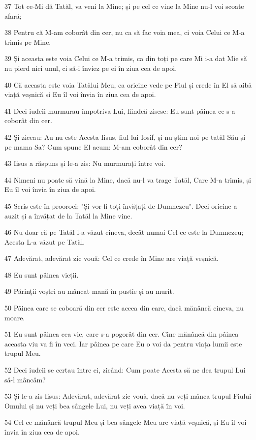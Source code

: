 \par 37 Tot ce-Mi dă Tatăl, va veni la Mine; și pe cel ce vine la Mine nu-l voi scoate afară;
\par 38 Pentru că M-am coborât din cer, nu ca să fac voia mea, ci voia Celui ce M-a trimis pe Mine.
\par 39 Și aceasta este voia Celui ce M-a trimis, ca din toți pe care Mi i-a dat Mie să nu pierd nici unul, ci să-i înviez pe ei în ziua cea de apoi.
\par 40 Că aceasta este voia Tatălui Meu, ca oricine vede pe Fiul și crede în El să aibă viață veșnică și Eu îl voi învia în ziua cea de apoi.
\par 41 Deci iudeii murmurau împotriva Lui, fiindcă zisese: Eu sunt pâinea ce s-a coborât din cer.
\par 42 Și ziceau: Au nu este Acesta Iisus, fiul lui Iosif, și nu știm noi pe tatăl Său și pe mama Sa? Cum spune El acum: M-am coborât din cer?
\par 43 Iisus a răspuns și le-a zis: Nu murmurați între voi.
\par 44 Nimeni nu poate să vină la Mine, dacă nu-l va trage Tatăl, Care M-a trimis, și Eu îl voi învia în ziua de apoi.
\par 45 Scris este în prooroci: "Și vor fi toți învățați de Dumnezeu". Deci oricine a auzit și a învățat de la Tatăl la Mine vine.
\par 46 Nu doar că pe Tatăl l-a văzut cineva, decât numai Cel ce este la Dumnezeu; Acesta L-a văzut pe Tatăl.
\par 47 Adevărat, adevărat zic vouă: Cel ce crede în Mine are viață veșnică.
\par 48 Eu sunt pâinea vieții.
\par 49 Părinții voștri au mâncat mană în pustie și au murit.
\par 50 Pâinea care se coboară din cer este aceea din care, dacă mănâncă cineva, nu moare.
\par 51 Eu sunt pâinea cea vie, care s-a pogorât din cer. Cine mănâncă din pâinea aceasta viu va fi în veci. Iar pâinea pe care Eu o voi da pentru viața lumii este trupul Meu.
\par 52 Deci iudeii se certau între ei, zicând: Cum poate Acesta să ne dea trupul Lui să-l mâncăm?
\par 53 Și le-a zis Iisus: Adevărat, adevărat zic vouă, dacă nu veți mânca trupul Fiului Omului și nu veți bea sângele Lui, nu veți avea viață în voi.
\par 54 Cel ce mănâncă trupul Meu și bea sângele Meu are viață veșnică, și Eu îl voi învia în ziua cea de apoi.
